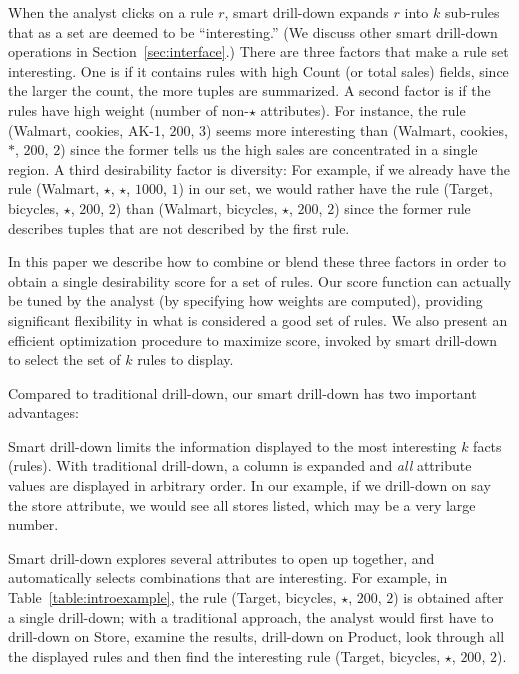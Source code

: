\begin{example}
When the analyst clicks on a rule $r$, smart drill-down
expands $r$ into $k$ sub-rules that as a set are deemed to be ``interesting.''
(We discuss other smart drill-down operations in Section~\ref{sec:interface}.)
There are three factors that make a rule set interesting.
One is if it contains rules with high Count (or total sales) fields,
since the larger the count, the more tuples are summarized.
A second factor is if the rules have high weight (number of non-$\star$ attributes).
For instance, the rule (Walmart, cookies, AK-1, $200$, $3$)
seems more interesting than (Walmart, cookies, $*$, $200$, $2$)
since the former tells us the high sales are concentrated in a single region.
A third desirability factor is diversity:
For example, if we already have the rule (Walmart, $\star$, $\star$, $1000$, $1$)
in our set, we would rather have the rule (Target, bicycles, $\star$, $200$, $2$)
than (Walmart, bicycles, $\star$, $200$, $2$) since the former rule
describes tuples that are not described by the first rule.

In this paper we describe how to combine or blend these three factors
in order to obtain a single desirability score for a set of rules.
Our score function can actually be tuned by the analyst
(by specifying how weights are computed),
providing significant flexibility in what is considered a good set of rules.
We also present an efficient optimization procedure to maximize score, invoked
by smart drill-down to select the set of $k$ rules to display.

\end{example}

Compared to traditional drill-down, our smart drill-down has two important advantages:
\squishlist
\item
Smart drill-down limits the information displayed
to the most interesting $k$ facts (rules).
With traditional drill-down, a column is expanded and {\em all}
attribute values are displayed in arbitrary order.
In our example, if we drill-down on say the store attribute,
we would see all stores listed, which may be a very large number.
\item
Smart drill-down explores several attributes to open up together,
and automatically selects combinations that are interesting.
For example, in Table~\ref{table:introexample},
the rule (Target, bicycles, $\star$, $200$, $2$)
is obtained after a single drill-down;
with a traditional approach, the analyst would first have to drill-down on
Store, examine the results, drill-down on Product,
look through all the displayed rules and then find the interesting rule
(Target, bicycles, $\star$, $200$, $2$).
\squishend

